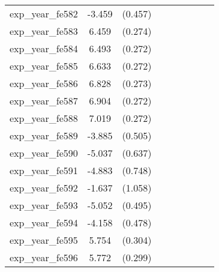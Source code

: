 {\begin{tabular}{l*{4}{cc}}
exp\_year\_fe582&   -3.459\sym{***}&  (0.457)&                  &         &                  &         &                  &         \\
exp\_year\_fe583&    6.459\sym{***}&  (0.274)&                  &         &                  &         &                  &         \\
exp\_year\_fe584&    6.493\sym{***}&  (0.272)&                  &         &                  &         &                  &         \\
exp\_year\_fe585&    6.633\sym{***}&  (0.272)&                  &         &                  &         &                  &         \\
exp\_year\_fe586&    6.828\sym{***}&  (0.273)&                  &         &                  &         &                  &         \\
exp\_year\_fe587&    6.904\sym{***}&  (0.272)&                  &         &                  &         &                  &         \\
exp\_year\_fe588&    7.019\sym{***}&  (0.272)&                  &         &                  &         &                  &         \\
exp\_year\_fe589&   -3.885\sym{***}&  (0.505)&                  &         &                  &         &                  &         \\
exp\_year\_fe590&   -5.037\sym{***}&  (0.637)&                  &         &                  &         &                  &         \\
exp\_year\_fe591&   -4.883\sym{***}&  (0.748)&                  &         &                  &         &                  &         \\
exp\_year\_fe592&   -1.637         &  (1.058)&                  &         &                  &         &                  &         \\
exp\_year\_fe593&   -5.052\sym{***}&  (0.495)&                  &         &                  &         &                  &         \\
exp\_year\_fe594&   -4.158\sym{***}&  (0.478)&                  &         &                  &         &                  &         \\
exp\_year\_fe595&    5.754\sym{***}&  (0.304)&                  &         &                  &         &                  &         \\
exp\_year\_fe596&    5.772\sym{***}&  (0.299)&                  &         &                  &         &                  &         \\

\end{tabular}}
